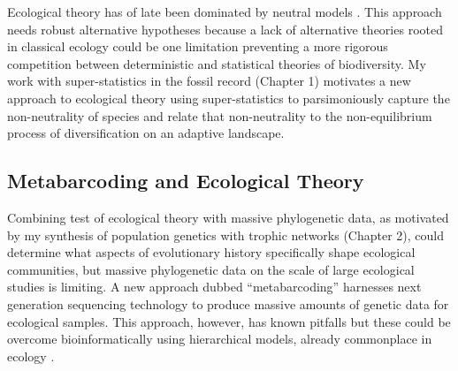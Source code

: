 Ecological theory has of late been dominated by neutral models
\citep[e.g.][]{rominger2009, rominger2015GEB}. This approach needs
robust alternative hypotheses because a lack of alternative theories
rooted in classical ecology could be one limitation preventing a more
rigorous competition between deterministic and statistical theories of
biodiversity. My work with super-statistics in the fossil record
(Chapter 1) motivates a new approach to ecological theory using
super-statistics to parsimoniously capture the non-neutrality of
species and relate that non-neutrality to the non-equilibrium process
of diversification on an adaptive landscape.

\subsection{Metabarcoding and Ecological Theory}

Combining test of ecological theory with massive phylogenetic data, as
motivated by my synthesis of population genetics with trophic networks
(Chapter 2), could determine what aspects of evolutionary history
specifically shape ecological communities, but massive phylogenetic
data on the scale of large ecological studies is limiting.  A new
approach dubbed ``metabarcoding'' \citep{taberlet2012} harnesses next
generation sequencing technology to produce massive amounts of genetic
data for ecological samples. This approach, however, has known
pitfalls \citep[e.g. bias in primer affinities between
taxa][]{clarke2014} but these could be overcome bioinformatically
using hierarchical models, already commonplace in ecology
\citep{royleDorazio}.

\printbibliography[heading=subbibliography]